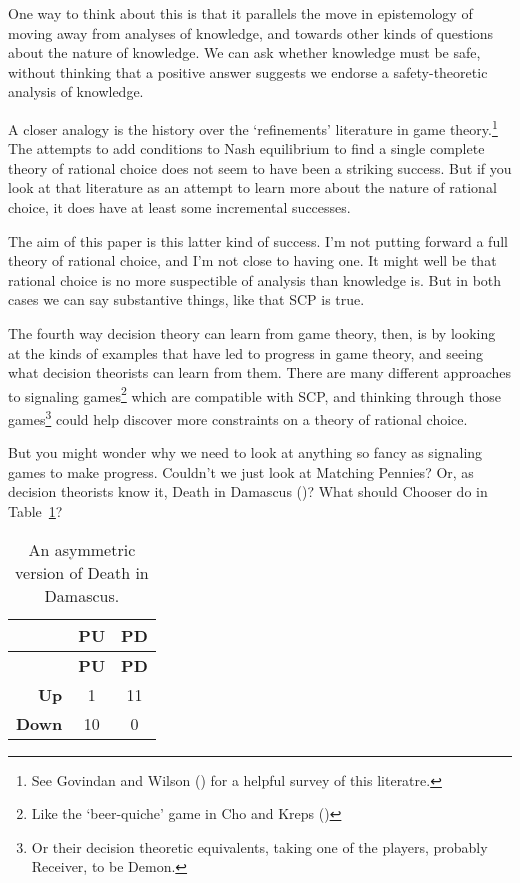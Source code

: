 \documentclass[
  10pt,
  letterpaper,
  DIV=11,
  numbers=noendperiod,
  twoside]{scrartcl}
\begin{document}
One way to think about this is that it parallels the move in
epistemology of moving away from analyses of knowledge, and towards
other kinds of questions about the nature of knowledge. We can ask
whether knowledge must be safe, without thinking that a positive answer
suggests we endorse a safety-theoretic analysis of knowledge.

A closer analogy is the history over the `refinements' literature in
game theory.\footnote{See Govindan and Wilson
  () for a helpful survey of this
  literatre.} The attempts to add conditions to Nash equilibrium to find
a single complete theory of rational choice does not seem to have been a
striking success. But if you look at that literature as an attempt to
learn more about the nature of rational choice, it does have at least
some incremental successes.

The aim of this paper is this latter kind of success. I'm not putting
forward a full theory of rational choice, and I'm not close to having
one. It might well be that rational choice is no more suspectible of
analysis than knowledge is. But in both cases we can say substantive
things, like that SCP is true.

The fourth way decision theory can learn from game theory, then, is by
looking at the kinds of examples that have led to progress in game
theory, and seeing what decision theorists can learn from them. There
are many different approaches to signaling games\footnote{Like the
  `beer-quiche' game in Cho and Kreps
  ()} which are compatible with SCP,
and thinking through those games\footnote{Or their decision theoretic
  equivalents, taking one of the players, probably Receiver, to be
  Demon.} could help discover more constraints on a theory of rational
choice.

But you might wonder why we need to look at anything so fancy as
signaling games to make progress. Couldn't we just look at Matching
Pennies? Or, as decision theorists know it, Death in Damascus
()? What should
Chooser do in Table~\ref{tbl-mean-demon}?

\begin{longtable}[]{@{}rcc@{}}
\caption{An asymmetric version of Death in
Damascus.}\label{tbl-mean-demon}\tabularnewline
\toprule\noalign{}
& \textbf{PU} & \textbf{PD} \\
\midrule\noalign{}
\endfirsthead
\toprule\noalign{}
& \textbf{PU} & \textbf{PD} \\
\midrule\noalign{}
\endhead
\bottomrule\noalign{}
\endlastfoot
\textbf{Up} & 1 & 11 \\
\textbf{Down} & 10 & 0 \\
\end{longtable}
\end{document}
